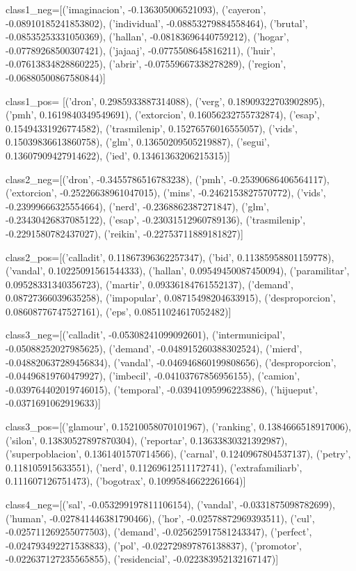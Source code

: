 class1_neg=[('imaginacion', -0.136305006521093),
 ('cayeron', -0.08910185241853802),
 ('individual', -0.08853279884558464),
 ('brutal', -0.08535253331050369),
 ('hallan', -0.08183696440759212),
 ('hogar', -0.07789268500307421),
 ('jajaaj', -0.0775508645816211),
 ('huir', -0.07613834828860225),
 ('abrir', -0.07559667338278289),
 ('region', -0.06880500867580844)]
 
class1_pos= [('dron', 0.2985933887314088),
 ('verg', 0.18909322703902895),
 ('pmh', 0.1619840349549691),
 ('extorcion', 0.16056232755732874),
 ('esap', 0.15494331926774582),
 ('trasmilenip', 0.15276576016555057),
 ('vids', 0.15039836613860758),
 ('glm', 0.13650209505219887),
 ('segui', 0.13607909427914622),
 ('ied', 0.13461363206215315)]
 
 class2_neg=[('dron', -0.3455786516783238),
 ('pmh', -0.25390686406564117),
 ('extorcion', -0.25226638961047015),
 ('mins', -0.2462153827570772),
 ('vids', -0.23999666325554664),
 ('nerd', -0.2368862387271847),
 ('glm', -0.23430426837085122),
 ('esap', -0.23031512960789136),
 ('trasmilenip', -0.2291580782437027),
 ('reikin', -0.22753711889181827)]
 
 class2_pos=[('calladit', 0.11867396362257347),
 ('bid', 0.11385958801159778),
 ('vandal', 0.10225091561544333),
 ('hallan', 0.09549450087450094),
 ('paramilitar', 0.09528331340356723),
 ('martir', 0.09336184761552137),
 ('demand', 0.08727366039635258),
 ('impopular', 0.08715498204633915),
 ('desproporcion', 0.08608776747527161),
 ('eps', 0.08511024617052482)]
 
 class3_neg=[('calladit', -0.05308241099092601),
 ('intermunicipal', -0.05088252027985625),
 ('demand', -0.048915260388302524),
 ('mierd', -0.048820637289456834),
 ('vandal', -0.046946860199808656),
 ('desproporcion', -0.04496819760479927),
 ('imbecil', -0.04103767856956155),
 ('camion', -0.039764402019746015),
 ('temporal', -0.03941095996223886),
 ('hijueput', -0.0371691062919633)]
 
 class3_pos=[('glamour', 0.15210058070101967),
 ('ranking', 0.1384666518917006),
 ('silon', 0.13830527897870304),
 ('reportar', 0.13633830321392987),
 ('superpoblacion', 0.1361401570714566),
 ('carnal', 0.1240967804537137),
 ('petry', 0.118105915633551),
 ('nerd', 0.11269612511172741),
 ('extrafamiliarb', 0.111607126751473),
 ('bogotrax', 0.10995846622261664)]
 
 class4_neg=[('sal', -0.053299197811106154),
 ('vandal', -0.0331875098782699),
 ('human', -0.027841446381790466),
 ('hor', -0.02578872969393511),
 ('cul', -0.025711269255077503),
 ('demand', -0.025625917581243347),
 ('perfect', -0.024793492271538833),
 ('pol', -0.022729897876138837),
 ('promotor', -0.022637127235565855),
 ('residencial', -0.022383952132167147)]
 
